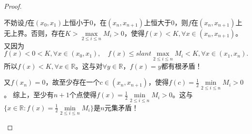 \documentclass[../../main.tex]{subfiles}
\begin{document}
\begin{proof}
\begin{enumerate}
不妨设\(f\)在\(( x_0,x_1 )\)上恒小于\(0\)，在\(( x_n,x_{n + 1} )\)上恒大于\(0\)，则\(f\)在\(( x_n,x_{n + 1} )\)上无上界。否则，存在\(K>\underset{2\leqslant  i\leqslant  n}{\max}M_i>0\)，使得\(f( x ) <K,\forall x\in ( x_n,x_{n + 1} )\)。又因为
\(f( x ) <0<K,\forall x\in ( x_0,x_1 ),\quad f( x ) \leqslant slant \underset{2\leqslant  i\leqslant  n}{\max}M_i<K,\forall x\in ( x_1,x_n ).\)
所以\(f( x ) <K,\forall x\in \mathbb{R} \)。这与对\(\forall y\in \mathbb{R} \)，\(f( x ) =y\)都有根矛盾！

又\(f( x_n ) =0\)，故至少存在一个\(c\in ( x_n,x_{n + 1} )\)，使得\(f( c ) =\frac{1}{2}\underset{2\leqslant  i\leqslant  n}{\min}M_i>0\)。
综上，至少有\(n + 1\)个点使得\(f( x ) =\frac{1}{2}\underset{2\leqslant  i\leqslant  n}{\min}M_i>0\)。这与\(\{ x\in \mathbb{R} :f( x ) =\frac{1}{2}\underset{2\leqslant  i\leqslant  n}{\min}M_i \}\)是\(n\)元集矛盾！
\end{enumerate}
\end{proof}
\end{document}
